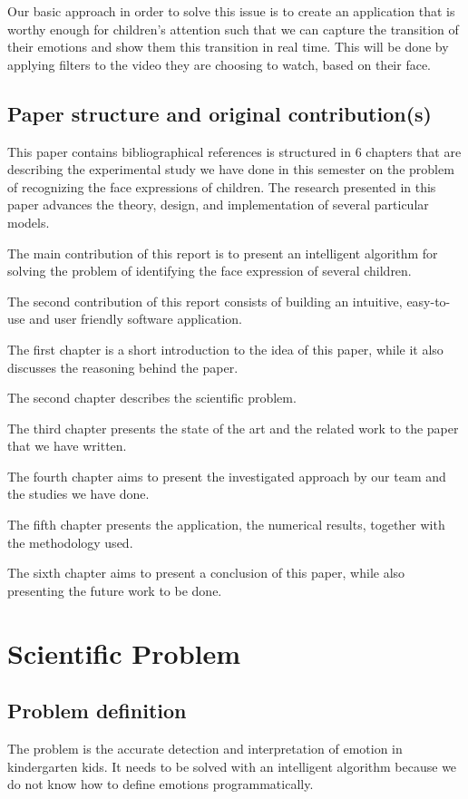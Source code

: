 \documentclass[runningheads,a4paper,11pt]{report}
\begin{document}
Our basic approach in order to solve this issue is to create an application that is worthy enough for children's attention such that we can capture the transition of their emotions and show them this transition in real time. This will be done by applying filters to the video they are choosing to watch, based on their face.


\section{Paper structure and original contribution(s)}
\label{section:structure}

This paper contains bibliographical references is structured in 6 chapters that are describing the experimental study we have done in this semester on the problem of recognizing the face expressions of children. The research presented in this paper advances the theory, design, and implementation of several particular models. 

The main contribution of this report is to present an intelligent algorithm for solving the problem of identifying the face expression of several children.

The second contribution of this report consists of building an intuitive, easy-to-use and user
friendly software application.

The first chapter is a short introduction to the idea of this paper, while it also discusses the reasoning behind the paper.

The second chapter describes the scientific problem.

The third chapter presents the state of the art and the related work to the paper that we have written.

The fourth chapter aims to present the investigated approach by our team and the studies we have done.

The fifth chapter presents the application, the numerical results, together with the methodology used.

The sixth chapter aims to present a conclusion of this paper, while also presenting the future work to be done.



\chapter{Scientific Problem}
\label{section:scientificProblem}


\section{Problem definition}
\label{section:problemDefinition}
The problem is the accurate detection and interpretation of emotion in kindergarten kids. It needs to be solved with an intelligent algorithm because we do not know how to define emotions programmatically.
\end{document}
